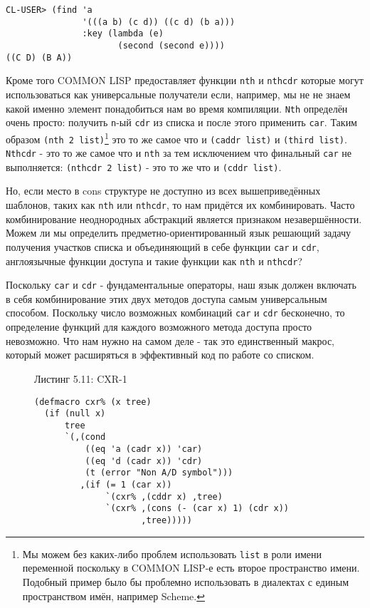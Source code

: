 \begin{verbatim}
CL-USER> (find 'a
               '(((a b) (c d)) ((c d) (b a)))
               :key (lambda (e)
                      (second (second e))))
((C D) (B A))
\end{verbatim}

Кроме того COMMON LISP предоставляет функции \verb"nth" и \verb"nthcdr" которые могут использоваться как универсальные получатели если, например, мы не не знаем какой именно элемент понадобиться нам во время компиляции. \verb"Nth" определён очень просто: получить \verb"n"-ый \verb"cdr" из списка и после этого применить \verb"car". Таким образом \verb"(nth 2 list)"\footnote{Мы можем без каких-либо проблем использовать \verb"list" в роли имени переменной поскольку в COMMON LISP-е есть второе пространство имени. Подобный пример было бы проблемно использовать в диалектах с единым пространством имён, например Scheme.} это то же самое что и \verb"(caddr list)" и \verb"(third list)". \verb"Nthcdr" - это то же самое что и \verb"nth" за тем исключением что финальный \verb"car" не выполняется: \verb"(nthcdr 2 list)" - это то же что и \verb"(cddr list)".



Но, если место в cons структуре не доступно из всех вышеприведённых шаблонов, таких как \verb"nth" или \verb"nthcdr", то нам придётся их комбинировать. Часто комбинирование неоднородных абстракций является признаком незавершённости. Можем ли мы определить предметно-ориентированный язык решающий задачу получения участков списка и объединяющий в себе функции \verb"car" и \verb"cdr", англоязычные функции доступа и такие функции как \verb"nth" и \verb"nthcdr"?

Поскольку \verb"car" и \verb"cdr" - фундаментальные операторы, наш язык должен включать в себя комбинирование этих двух методов доступа самым универсальным способом. Поскольку число возможных комбинаций \verb"car" и \verb"cdr" бесконечно, то определение функций для каждого возможного метода доступа просто невозможно. Что нам нужно на самом деле - так это единственный макрос, который может расширяться в эффективный код по работе со списком.

\begin{figure}Листинг 5.11: CXR-1\label{listing_5.11}
\listbegin
\begin{verbatim}
(defmacro cxr% (x tree)
  (if (null x)
      tree
      `(,(cond
          ((eq 'a (cadr x)) 'car)
          ((eq 'd (cadr x)) 'cdr)
          (t (error "Non A/D symbol")))
         ,(if (= 1 (car x))
              `(cxr% ,(cddr x) ,tree)
              `(cxr% ,(cons (- (car x) 1) (cdr x))
                     ,tree)))))
\end{verbatim}
\listend
\end{figure}

